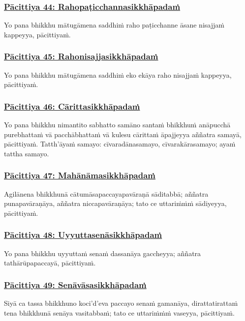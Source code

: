 \subsubsection*{\hyperref[exp44]{Pācittiya 44: Rahopaṭicchannasikkhāpadaṁ}}
\label{pac44}
Yo pana bhikkhu mātugāmena saddhiṁ raho paṭicchanne āsane nisajjaṁ kappeyya, pācittiyaṁ.

\subsubsection*{\hyperref[exp45]{Pācittiya 45: Rahonisajjasikkhāpadaṁ}}
\label{pac45}
Yo pana bhikkhu mātugāmena saddhiṁ eko ekāya raho nisajjaṁ kappeyya, pācittiyaṁ.

\subsubsection*{\hyperref[exp46]{Pācittiya 46: Cārittasikkhāpadaṁ}}
\label{pac46}
Yo pana bhikkhu nimantito sabhatto samāno santaṁ bhikkhuṁ anāpucchā purebhattaṁ vā pacchābhattaṁ vā kulesu cārittaṁ āpajjeyya aññatra samayā, pācittiyaṁ. Tatth'āyaṁ samayo: cīvaradānasamayo, cīvarakārasamayo; ayaṁ tattha samayo.

\subsubsection*{\hyperref[exp47]{Pācittiya 47: Mahānāmasikkhāpadaṁ}}
\label{pac47}
Agilānena bhikkhunā cātumāsapaccayapavāraṇā sāditabbā; aññatra punapavāraṇāya, aññatra niccapavāraṇāya; tato ce uttariṁṁṁ sādiyeyya, pācittiyaṁ.

\subsubsection*{\hyperref[exp48]{Pācittiya 48: Uyyuttasenāsikkhāpadaṁ}}
\label{pac48}
Yo pana bhikkhu uyyuttaṁ senaṁ dassanāya gaccheyya; aññatra tathārūpapaccayā, pācittiyaṁ.

\subsubsection*{\hyperref[exp49]{Pācittiya 49: Senāvāsasikkhāpadaṁ}}
\label{pac49}
Siyā ca tassa bhikkhuno koci'd'eva paccayo senaṁ gamanāya, dirattatirattaṁ tena bhikkhunā senāya vasitabbaṁ; tato ce uttariṁṁṁ vaseyya, pācittiyaṁ.

